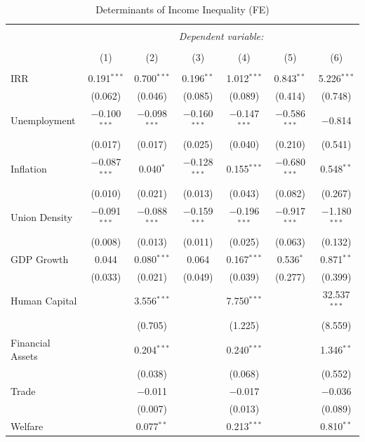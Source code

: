 \documentclass[
  12pt,
]{article}
\begin{document}
\begin{table}[!htbp] \centering 
  \caption{\label{ineq1}Determinants of Income Inequality (FE)} 
  \label{} 
\small 
\begin{tabular}{@{\extracolsep{5pt}}lcccccc} 
\\[-1.8ex]\hline 
\hline \\[-1.8ex] 
 & \multicolumn{6}{c}{\textit{Dependent variable:}} \\ 
\cline{2-7} 
\\[-1.8ex] & (1) & (2) & (3) & (4) & (5) & (6)\\ 
\hline \\[-1.8ex] 
 IRR & 0.191$^{***}$ & 0.700$^{***}$ & 0.196$^{**}$ & 1.012$^{***}$ & 0.843$^{**}$ & 5.226$^{***}$ \\ 
  & (0.062) & (0.046) & (0.085) & (0.089) & (0.414) & (0.748) \\ 
  Unemployment & $-$0.100$^{***}$ & $-$0.098$^{***}$ & $-$0.160$^{***}$ & $-$0.147$^{***}$ & $-$0.586$^{***}$ & $-$0.814 \\ 
  & (0.017) & (0.017) & (0.025) & (0.040) & (0.210) & (0.541) \\ 
  Inflation & $-$0.087$^{***}$ & 0.040$^{*}$ & $-$0.128$^{***}$ & 0.155$^{***}$ & $-$0.680$^{***}$ & 0.548$^{**}$ \\ 
  & (0.010) & (0.021) & (0.013) & (0.043) & (0.082) & (0.267) \\ 
  Union Density & $-$0.091$^{***}$ & $-$0.088$^{***}$ & $-$0.159$^{***}$ & $-$0.196$^{***}$ & $-$0.917$^{***}$ & $-$1.180$^{***}$ \\ 
  & (0.008) & (0.013) & (0.011) & (0.025) & (0.063) & (0.132) \\ 
  GDP Growth & 0.044 & 0.080$^{***}$ & 0.064 & 0.167$^{***}$ & 0.536$^{*}$ & 0.871$^{**}$ \\ 
  & (0.033) & (0.021) & (0.049) & (0.039) & (0.277) & (0.399) \\ 
  Human Capital &  & 3.556$^{***}$ &  & 7.750$^{***}$ &  & 32.537$^{***}$ \\ 
  &  & (0.705) &  & (1.225) &  & (8.559) \\ 
  Financial Assets &  & 0.204$^{***}$ &  & 0.240$^{***}$ &  & 1.346$^{**}$ \\ 
  &  & (0.038) &  & (0.068) &  & (0.552) \\ 
  Trade &  & $-$0.011 &  & $-$0.017 &  & $-$0.036 \\ 
  &  & (0.007) &  & (0.013) &  & (0.089) \\ 
  Welfare &  & 0.077$^{**}$ &  & 0.213$^{***}$ &  & 0.810$^{**}$ \\ 

\end{tabular}
\end{table}
\end{document}
